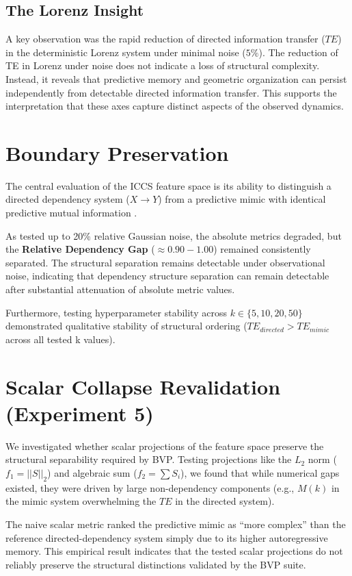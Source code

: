 \documentclass[11pt,a4paper]{article}
\begin{document}
\subsection*{The Lorenz Insight}
A key observation was the rapid reduction of directed information transfer ($TE$) in the deterministic Lorenz system \cite{Lorenz1963} under minimal noise ($5\%$). The reduction of TE in Lorenz under noise does not indicate a loss of structural complexity. Instead, it reveals that predictive memory and geometric organization can persist independently from detectable directed information transfer. This supports the interpretation that these axes capture distinct aspects of the observed dynamics.

\section{Boundary Preservation}
The central evaluation of the ICCS feature space is its ability to distinguish a directed dependency system ($X \rightarrow Y$) from a predictive mimic with identical predictive mutual information \cite{Kraskov2004}. 

As tested up to 20\% relative Gaussian noise, the absolute metrics degraded, but the \textbf{Relative Dependency Gap} ($\approx 0.90 - 1.00$) remained consistently separated. The structural separation remains detectable under observational noise, indicating that dependency structure separation can remain detectable after substantial attenuation of absolute metric values.

Furthermore, testing hyperparameter stability across $k \in \{5, 10, 20, 50\}$ demonstrated qualitative stability of structural ordering ($TE_{directed} > TE_{mimic}$ across all tested k values).

\section{Scalar Collapse Revalidation (Experiment 5)}
We investigated whether scalar projections of the feature space preserve the structural separability required by BVP. Testing projections like the $L_2$ norm ($f_1 = ||S||_2$) and algebraic sum ($f_2 = \sum S_i$), we found that while numerical gaps existed, they were driven by large non-dependency components (e.g., $M(k)$ in the mimic system overwhelming the $TE$ in the directed system). 

The naive scalar metric ranked the predictive mimic as ``more complex'' than the reference directed-dependency system simply due to its higher autoregressive memory. This empirical result indicates that the tested scalar projections do not reliably preserve the structural distinctions validated by the BVP suite.
\end{document}
